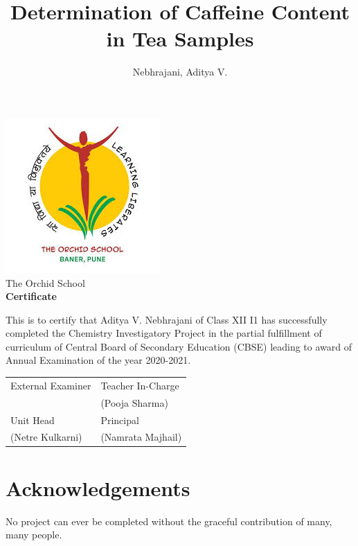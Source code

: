 \documentclass[11pt]{article}
\title{Determination of Caffeine Content in Tea Samples}
\author{ Nebhrajani, Aditya V.}%
\date{}
\begin{document}
\maketitle
\thispagestyle{empty}

\newpage


{\center\includegraphics[scale = 0.5]{tos_logo.jpeg}\\[0.25in]} {\center\LARGE The Orchid School\\}
{\center\huge\textbf {Certificate}\\[0.5cm]}

This is to certify that Aditya V. Nebhrajani of Class XII I1 has successfully completed the Chemistry
Investigatory Project in the partial fulfillment of curriculum of Central Board of Secondary
Education (CBSE) leading to award of Annual Examination of the year 2020-2021.\\[1cm]


\begin{center}
\begin{tabularx}{\textwidth}{>{\centering\arraybackslash}X  >{\centering\arraybackslash}X}
External Examiner & Teacher In-Charge \\ & (Pooja Sharma)\\[1.5cm] Unit Head & Principal \\ (Netre
Kulkarni) & (Namrata Majhail) \\
\end{tabularx}
\end{center}

\newpage

\section*{Acknowledgements}

No project can ever be completed without the graceful contribution of many, many people.\\
\end{document}
